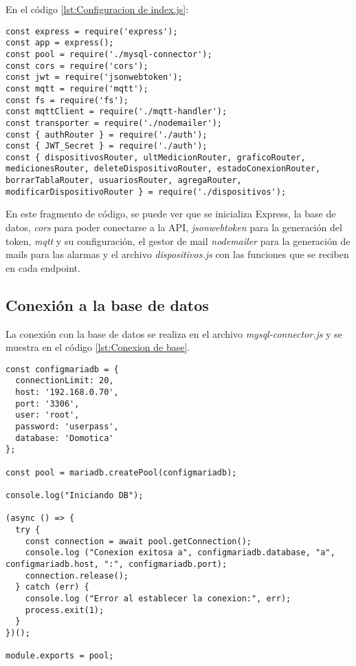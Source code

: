 En el código \ref{lst:Configuracion de index.js}:

\begin{lstlisting}[caption={Configuración de \textit{index.js}.}, label={lst:Configuracion de index.js}]
const express = require('express');
const app = express();
const pool = require('./mysql-connector');
const cors = require('cors');
const jwt = require('jsonwebtoken');
const mqtt = require('mqtt');
const fs = require('fs');
const mqttClient = require('./mqtt-handler');
const transporter = require('./nodemailer');
const { authRouter } = require('./auth');
const { JWT_Secret } = require('./auth');
const { dispositivosRouter, ultMedicionRouter, graficoRouter, medicionesRouter, deleteDispositivoRouter, estadoConexionRouter, borrarTablaRouter, usuariosRouter, agregaRouter, modificarDispositivoRouter } = require('./dispositivos');
\end{lstlisting}

En este fragmento de código, se puede ver que se inicializa Express, la base de datos, \textit{cors} para poder conectarse a la API, \textit{jsonwebtoken} para la generación del token, \textit{mqtt} y su configuración, el gestor de mail \textit{nodemailer} para la generación de mails para las alarmas y el archivo \textit{dispositivos.js} con las funciones que se reciben en cada endpoint.

\subsection{Conexión a la base de datos}

La conexión con la base de datos se realiza en el archivo \textit{mysql-connector.js} y se muestra en el código \ref{lst:Conexion de base}.

\begin{lstlisting}[caption={Conexión con la base de datos.}, label={lst:Conexion de base}]
const configmariadb = {
  connectionLimit: 20,
  host: '192.168.0.70',
  port: '3306',
  user: 'root',
  password: 'userpass',
  database: 'Domotica'
};

const pool = mariadb.createPool(configmariadb);

console.log("Iniciando DB");

(async () => {
  try {
    const connection = await pool.getConnection();
    console.log ("Conexion exitosa a", configmariadb.database, "a", configmariadb.host, ":", configmariadb.port);
    connection.release();
  } catch (err) {
    console.log ("Error al establecer la conexion:", err);
    process.exit(1);
  }
})();

module.exports = pool;
\end{lstlisting}

